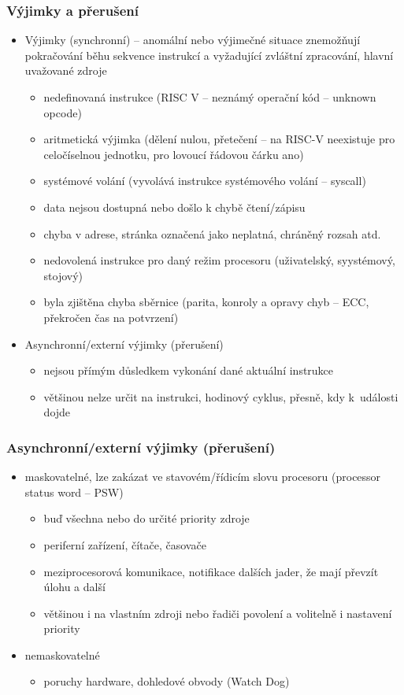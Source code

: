 \documentclass{beamer}
\begin{document}
\begin{frame}
\frametitle{Výjimky a přerušení}

\begin{itemize}
 \item Výjimky (synchronní) -- anomální nebo výjimečné situace znemožňují pokračování běhu sekvence instrukcí a vyžadující zvláštní zpracování, hlavní uvažované zdroje
 \begin{itemize}
  \item nedefinovaná instrukce (RISC V -- neznámý operační kód -- unknown opcode)
  \item aritmetická výjimka (dělení nulou, přetečení -- na RISC-V neexistuje pro celočíselnou jednotku, pro lovoucí řádovou čárku ano)
  \item systémové volání (vyvolává instrukce systémového volání -- syscall)
  \item data nejsou dostupná nebo došlo k chybě čtení/zápisu
  \item chyba v adrese, stránka označená jako neplatná, chráněný rozsah atd.
  \item nedovolená instrukce pro daný režim procesoru (uživatelský, syystémový, stojový)
  \item byla zjištěna chyba sběrnice (parita, konroly a opravy chyb -- ECC, překročen čas na potvrzení)
 \end{itemize}
 \item Asynchronní/externí výjimky (přerušení)
 \begin{itemize}
  \item nejsou přímým důsledkem vykonání dané aktuální instrukce
  \item většinou nelze určit na instrukci, hodinový cyklus, přesně, kdy k~události dojde
 \end{itemize}
\end{itemize}
\end{frame}

\begin{frame}
\frametitle{Asynchronní/externí výjimky (přerušení)}

\begin{itemize}
 \item maskovatelné, lze zakázat ve stavovém/řídicím slovu procesoru (processor status word -- PSW)
 \begin{itemize}
   \item buď všechna nebo do určité priority zdroje
   \item periferní zařízení, čítače, časovače
   \item meziprocesorová komunikace, notifikace dalších jader, že mají převzít úlohu a další
   \item většinou i na vlastním zdroji nebo řadiči povolení a volitelně i nastavení priority
 \end{itemize}
 \item nemaskovatelné
 \begin{itemize}
  \item poruchy hardware, dohledové obvody (Watch Dog)
 \end{itemize}
\end{itemize}
\end{frame}
\end{document}
